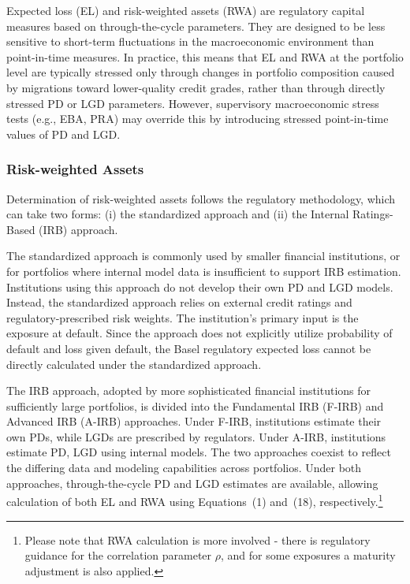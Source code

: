 \documentclass[11pt,a4paper]{article}
\begin{document}
Expected loss (EL) and risk-weighted assets (RWA) are regulatory capital measures based on through-the-cycle parameters. They are designed to be less sensitive to short-term fluctuations in the macroeconomic environment than point-in-time measures. In practice, this means that EL and RWA at the portfolio level are typically stressed only through changes in portfolio composition caused by migrations toward lower-quality credit grades, rather than through directly stressed PD or LGD parameters. However, supervisory macroeconomic stress tests (e.g., EBA, PRA) may override this by introducing stressed point-in-time values of PD and LGD.

\subsubsection{Risk-weighted Assets}

Determination of risk-weighted assets follows the regulatory methodology, which can take two forms: (i) the standardized approach and (ii) the Internal Ratings-Based (IRB) approach.

The standardized approach is commonly used by smaller financial institutions, or for portfolios where internal model data is insufficient to support IRB estimation. Institutions using this approach do not develop their own PD and LGD models. Instead, the standardized approach relies on external credit ratings and regulatory-prescribed risk weights. The institution's primary input is the exposure at default. Since the approach does not explicitly utilize probability of default and loss given default, the Basel regulatory expected loss cannot be directly calculated under the standardized approach.

The IRB approach, adopted by more sophisticated financial institutions for sufficiently large portfolios, is divided into the Fundamental IRB (F-IRB) and Advanced IRB (A-IRB) approaches. Under F-IRB, institutions estimate their own PDs, while LGDs are prescribed by regulators. Under A-IRB, institutions estimate PD, LGD using internal models. The two approaches coexist to reflect the differing data and modeling capabilities across portfolios. Under both approaches, through-the-cycle PD and LGD estimates are available, allowing calculation of both EL and RWA using Equations~(1) and~(18), respectively.\footnote{Please note that RWA calculation is more involved - there is regulatory guidance for the correlation parameter $\rho$, and for some exposures a maturity adjustment is also applied.}
\end{document}
